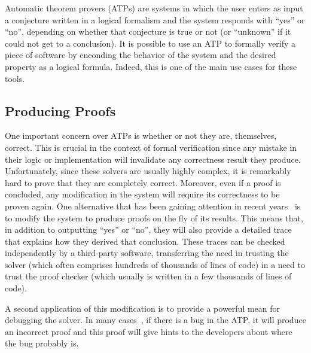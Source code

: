 \documentclass[a4paper, 12pt]{article}
\begin{document}

Automatic theorem provers (ATPs) are systems in which the user enters as input a conjecture written in
a logical
formalism and the system responds with ``yes'' or ``no'', depending on whether that conjecture is true or
not (or ``unknown'' if it could not get to a conclusion).
It is possible to use an ATP to formally verify a piece of software by enconding the behavior of the system
and the desired property as a logical formula. Indeed, this is one of the main use cases for these tools.

\subsection{Producing Proofs}

One important concern over ATPs is whether or not they are, themselves, correct. This is crucial
in the context of formal verification since any mistake in their logic or implementation will invalidate any
correctness result they produce. Unfortunately, since these solvers are usually highly complex,
it is remarkably hard to prove that they are completely correct. Moreover, even if a proof is concluded,
any modification in the system will require its correctness to be proven again. One alternative that has been
gaining attention in recent years~\cite{generatingProofs, proofsInSmt} is to modify the system to produce
proofs on the fly of its results. This means that, in addition to outputting ``yes'' or ``no'', they will
also provide a detailed trace that explains how they derived that conclusion. These traces can be
checked independently by a third-party software, transferring the need in trusting the solver (which often
comprises hundreds of thousands of lines of code) in a need to trust the proof checker (which usually is
written in a few thousands of lines of code).

A second application of this modification is to provide a powerful mean for debugging the solver.
In many cases~\cite{generatingProofs}, if there is a bug in the ATP, it will produce an incorrect
proof and this proof will give hints to the developers about where the bug probably is.
\end{document}
